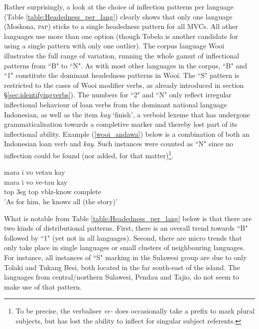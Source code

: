 Rather surprisingly, a look at the choice of inflection patterns per language (Table \ref{table:Headedness_per_lang}) clearly shows that only one language (Moskona, \textsc{pap}) sticks to a single headedness pattern for all MVCs. All other languages use more than one option (though Tobelo is another candidate for using a single pattern with only one outlier). The corpus language Wooi illustrates the full range of variation, running the whole gamut of inflectional patterns from ``B" to ``N". As with most other languages in the corpus, ``B" and ``1" constitute the dominant headedness patterns in Wooi. The ``S" pattern is restricted to the cases of Wooi modifier verbs, as already introduced in section §\ref{sec:identifyingverbs}). The numbers for ``2" and ``N" only reflect irregular inflectional behaviour of loan verbs from the dominant national language Indonesian, as well as the item \textit{kay} `finish', a verboid lexeme that has undergone grammaticalisation towards a completive marker and thereby lost part of its inflectional ability. Example (\ref{wooi_andawa}) below is a combination of both an Indonesian loan verb and \textit{kay}. Such instances were counted as ``N" since no inflection could be found (nor added, for that matter)\footnote{To be precise, the verbaliser \textit{ve-} does occasionally take a prefix to mark plural subjects, but has lost the ability to inflect for singular subject referents.}.

\ea \label{wooi_andawa}
\gll mara i vo vetau kay \\
mara i vo ve-tau kay \\
\glc \acs{top} \acs{3}\acs{sg} \acs{top} \acs{vblz}-know complete \\
\glft 'As for him, he knows all (the story)' \\ 
\z
\xe

What is notable from Table \ref{table:Headedness_per_lang} below is that there are two kinds of distributional patterns. First, there is an overall trend towards ``B" followed by ``1" (yet not in all languages). Second, there are micro trends that only take place in single languages or small clusters of neighbouring languages. For instance, all instances of ``S" marking in the Sulawesi group are due to only Tolaki and Tukang Besi, both located in the far south-east of the island. The languages from central/northern Sulawesi, Pendau and Tajio, do not seem to make use of that pattern. 

